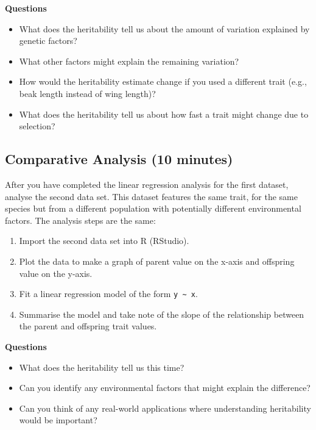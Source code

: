 \documentclass[
  a4paper]{book}
\providecommand{\tightlist}{%
  \setlength{\itemsep}{0pt}\setlength{\parskip}{0pt}}
\begin{document}
\textbf{Questions}

\begin{itemize}
\tightlist
\item
  What does the heritability tell us about the amount of variation explained by genetic factors?
\item
  What other factors might explain the remaining variation?
\item
  How would the heritability estimate change if you used a different trait (e.g., beak length instead of wing length)?
\item
  What does the heritability tell us about how fast a trait might change due to selection?
\end{itemize}

\hypertarget{comparative-analysis-10-minutes}{%
\subsection{Comparative Analysis (10 minutes)}\label{comparative-analysis-10-minutes}}

After you have completed the linear regression analysis for the first dataset, analyse the second data set. This dataset features the same trait, for the same species but from a different population with potentially different environmental factors. The analysis steps are the same:

\begin{enumerate}
\def\labelenumi{\arabic{enumi})}
\tightlist
\item
  Import the second data set into R (RStudio).
\item
  Plot the data to make a graph of parent value on the x-axis and offspring value on the y-axis.
\item
  Fit a linear regression model of the form \texttt{y\ \textasciitilde{}\ x}.
\item
  Summarise the model and take note of the slope of the relationship between the parent and offspring trait values.
\end{enumerate}

\textbf{Questions}

\begin{itemize}
\tightlist
\item
  What does the heritability tell us this time?
\item
  Can you identify any environmental factors that might explain the difference?
\item
  Can you think of any real-world applications where understanding heritability would be important?
\end{itemize}
\end{document}
